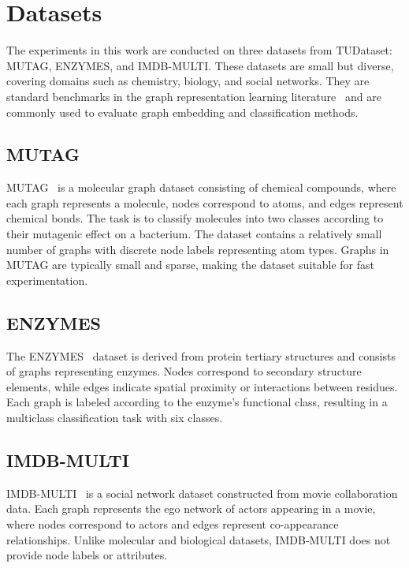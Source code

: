 \section{Datasets}

The experiments in this work are conducted on three datasets from TUDataset: MUTAG, ENZYMES, and IMDB-MULTI.
These datasets are small but diverse, covering domains such as chemistry, biology, and social networks.
They are standard benchmarks in the graph representation learning literature~\cite{narayanangraph2vec,tsitsulin2018netlsd,xu2019gin}
and are commonly used to evaluate graph embedding and classification methods.

\subsection{MUTAG}
MUTAG~\cite{debnath1991mutag} is a molecular graph dataset consisting of chemical compounds, where each graph represents a molecule,
nodes correspond to atoms, and edges represent chemical bonds.
The task is to classify molecules into two classes according to their mutagenic effect on a bacterium.
The dataset contains a relatively small number of graphs with discrete node labels representing atom types.
Graphs in MUTAG are typically small and sparse, making the dataset suitable for fast experimentation.

\subsection{ENZYMES}
The ENZYMES~\cite{rossi2015networkrepository} dataset is derived from protein tertiary structures and consists of graphs representing enzymes.
Nodes correspond to secondary structure elements, while edges indicate spatial proximity or interactions between residues.
Each graph is labeled according to the enzyme's functional class, resulting in a multiclass classification task with six classes.

\subsection{IMDB-MULTI}
IMDB-MULTI~\cite{rossi2015networkrepository} is a social network dataset constructed from movie collaboration data.
Each graph represents the ego network of actors appearing in a movie, where nodes correspond to actors and edges represent co-appearance relationships.
Unlike molecular and biological datasets, IMDB-MULTI does not provide node labels or attributes.
